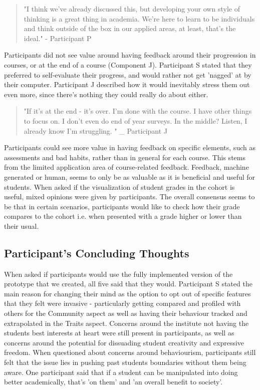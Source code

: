 \documentclass{l4proj}
\begin{document}
\begin{quote}
    "I think we've already discussed this, but developing your own style of thinking is a great thing in academia. We're here to learn to be individuals and think outside of the box in our applied areas, at least, that's the ideal." - Participant P
\end{quote}

Participants did not see value around having feedback around their progression in courses, or at the end of a course (Component J). Participant S stated that they preferred to self-evaluate their progress, and would rather not get 'nagged' at by their computer. Participant J described how it would inevitably stress them out even more, since there's nothing they could really do about either. 

\begin{quote}
    "If it's at the end - it's over. I'm done with the course. I have other things to focus on. I don't even do end of year surveys. In the middle? Listen, I already know I'm struggling. " _ Participant J
\end{quote}

Participants could see more value in having feedback on specific elements, such as assessments and bad habits, rather than in general for each course. This stems from the limited application area of course-related feedback. Feedback, machine generated or human, seems to only be as valuable as it is beneficial and useful for students. When asked if the visualization of student grades in the cohort is useful, mixed opinions were given by participants. The overall consensus seems to be that in certain scenarios, participants would like to check how their grade compares to the cohort i.e. when presented with a grade higher or lower than their usual.

\subsection{Participant's Concluding Thoughts}

When asked if participants would use the fully implemented version of the prototype that we created, all five said that they would. Participant S stated the main reason for changing their mind as the option to opt out of specific features that they felt were invasive - particularly getting compared and profiled with others for the Community aspect as well as having their behaviour tracked and extrapolated in the Traits aspect. Concerns around the institute not having the students best interests at heart were still present in participants, as well as concerns around the potential for dissuading student creativity and expressive freedom. When questioned about concerns around behaviourism, participants still felt that the issue lies in pushing past students boundaries without them being aware. One participant said that if a student can be manipulated into doing better academically, that's 'on them' and 'an overall benefit to society'. 
\end{document}
